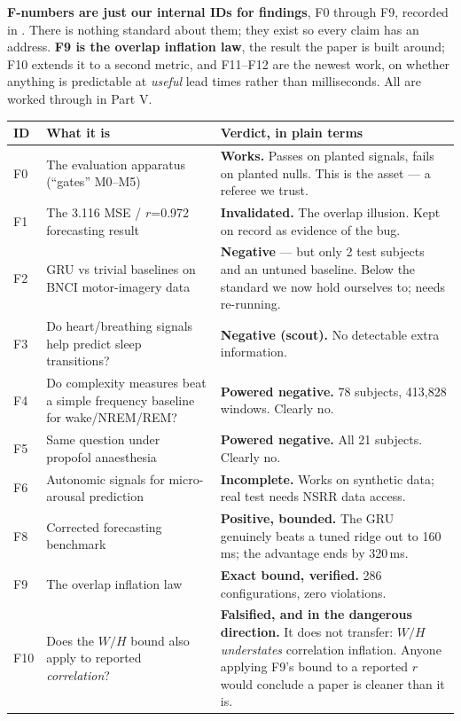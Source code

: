 \documentclass[11pt]{article}
\newcommand{\fp}[1]{\path{#1}}
\begin{document}
\textbf{F-numbers are just our internal IDs for findings}, F0 through F9, recorded
in \fp{docs/results/findings-ledger.md}. There is nothing standard about them;
they exist so every claim has an address. \textbf{F9 is the overlap inflation
law}, the result the paper is built around; F10 extends it to a second metric,
and F11--F12 are the newest work, on whether anything is predictable at
\emph{useful} lead times rather than milliseconds. All are worked through in
Part V.

\begin{center}\small
\begin{longtable}{p{}p{}p{}}
\toprule
\textbf{ID} & \textbf{What it is} & \textbf{Verdict, in plain terms} \\
\midrule
F0 & The evaluation apparatus (``gates'' M0--M5) & \textbf{Works.} Passes on planted signals, fails on planted nulls. This is the asset --- a referee we trust. \\
F1 & The 3.116 MSE / $r$=0.972 forecasting result & \textbf{Invalidated.} The overlap illusion. Kept on record as evidence of the bug. \\
F2 & GRU vs trivial baselines on BNCI motor-imagery data & \textbf{Negative} --- but only 2 test subjects and an untuned baseline. Below the standard we now hold ourselves to; needs re-running. \\
F3 & Do heart/breathing signals help predict sleep transitions? & \textbf{Negative (scout).} No detectable extra information. \\
F4 & Do complexity measures beat a simple frequency baseline for wake/NREM/REM? & \textbf{Powered negative.} 78 subjects, 413{,}828 windows. Clearly no. \\
F5 & Same question under propofol anaesthesia & \textbf{Powered negative.} All 21 subjects. Clearly no. \\
F6 & Autonomic signals for micro-arousal prediction & \textbf{Incomplete.} Works on synthetic data; real test needs NSRR data access. \\
F8 & Corrected forecasting benchmark & \textbf{Positive, bounded.} The GRU genuinely beats a tuned ridge out to 160\,ms; the advantage ends by 320\,ms. \\
F9 & The overlap inflation law & \textbf{Exact bound, verified.} 286 configurations, zero violations. \\
F10 & Does the $W/H$ bound also apply to reported \emph{correlation}? & \textbf{Falsified, and in the dangerous direction.} It does not transfer: $W/H$ \emph{understates} correlation inflation. Anyone applying F9's bound to a reported $r$ would conclude a paper is cleaner than it is. \\

\end{longtable}
\end{center}
\end{document}
